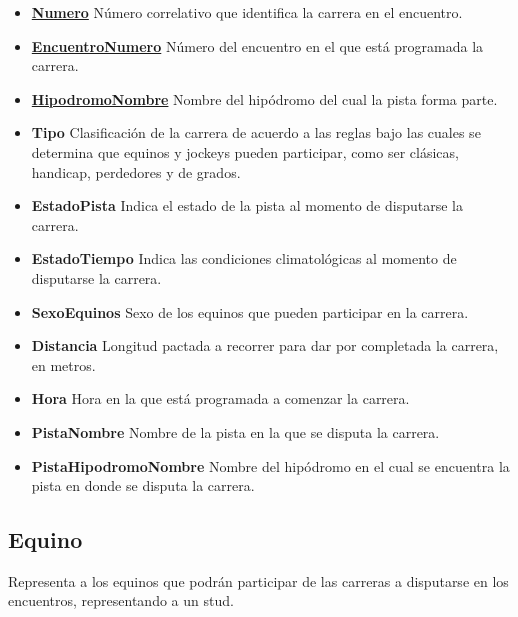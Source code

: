 \documentclass[a4paper,11pt]{article}
\begin{document}
\begin{itemize}

  \item \textbf{\uline{Numero}} Número correlativo que identifica la carrera en
    el encuentro.

  \item \textbf{\uline{EncuentroNumero}} Número del encuentro en el que está
    programada la carrera.

  \item \textbf{\uline{HipodromoNombre}} Nombre del hipódromo del
    cual la pista forma parte.

  \item \textbf{Tipo} Clasificación de la carrera de acuerdo a las reglas bajo
    las cuales se determina que equinos y jockeys pueden participar, como ser
    clásicas, handicap, perdedores y de grados.

  \item \textbf{EstadoPista} Indica el estado de la pista al momento de
    disputarse la carrera.

  \item \textbf{EstadoTiempo} Indica las condiciones climatológicas al momento
    de disputarse la carrera.

  \item \textbf{SexoEquinos} Sexo de los equinos que pueden participar en la
    carrera.

  \item \textbf{Distancia} Longitud pactada a recorrer para dar por completada
    la carrera, en metros.

  \item \textbf{Hora} Hora en la que está programada a comenzar la carrera.

  \item \textbf{PistaNombre} Nombre de la pista en la que se disputa la
    carrera.

  \item \textbf{PistaHipodromoNombre} Nombre del hipódromo en el cual se
    encuentra la pista en donde se disputa la carrera.

\end{itemize}

\subsection{Equino}

Representa a los equinos que podrán participar de las carreras a disputarse en
los encuentros, representando a un stud.
\end{document}
